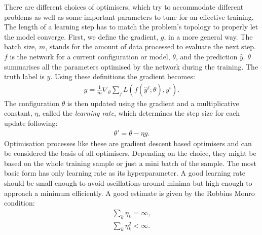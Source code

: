  There are different choices of optimisers, which try to accommodate different problems as well as some important parameters to tune for an effective training. The length of a learning step has to match the problem's topology to properly let the model converge. First, we define the gradient, $g$, in a more general way. The batch size, $m$, stands for the amount of data processed to evaluate the next step. $f$ is the network for a current configuration or model, $\theta$, and the prediction $\hat{y}$. $\theta$ summarises all the parameters optimised by the network during the training. The truth label is $y$. Using these definitions the gradient becomes:
\begin{align}
    g = \frac{1}{m} \nabla_{\theta} \sum_j L(f(\hat{y}^j; \theta), y^i).
\end{align}
%
The configuration $\theta$ is then updated using the gradient and a multiplicative constant, $\eta$, called the \emph{learning rate}, which determines the step size for each update following:
%
\begin{align}
    \theta \prime = \theta - \eta g.
\end{align}
%
Optimisation processes like these are gradient descent based optimisers and can be considered the basis of all optimisers. Depending on the choice, they might be based on the whole training sample or just a mini batch of the sample. The most basic form has only learning rate as its hyperparameter. A good learning rate should be small enough to avoid oscillations around minima but high enough to approach a minimum efficiently. A good estimate is given by the Robbins Monro condition:
%
\begin{align}
    \sum_k \eta_k = \infty,\\
    \sum_k \eta_k^2 < \infty.
\end{align}

